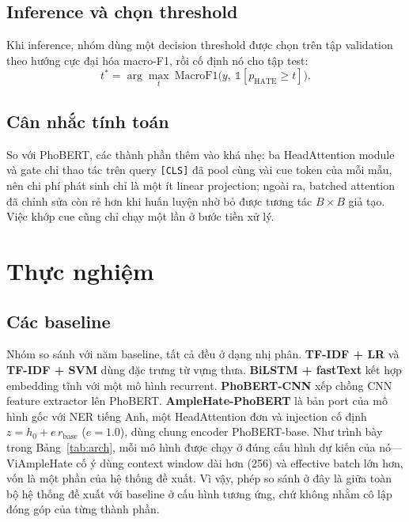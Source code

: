 \documentclass[11pt]{article}
\begin{document}
\subsection{Inference và chọn threshold}
Khi inference, nhóm dùng một decision threshold được chọn trên tập validation theo hướng cực đại hóa macro-F1, rồi cố định nó cho tập test:
\begin{equation}
  t^{*} = \arg\max_t\ \mathrm{MacroF1}\big(y,\ \mathbb{1}[p_{\mathrm{HATE}}\ge t]\big).
\end{equation}

\subsection{Cân nhắc tính toán}
So với PhoBERT, các thành phần thêm vào khá nhẹ: ba HeadAttention module và gate chỉ thao tác trên query \texttt{[CLS]} đã pool cùng vài cue token của mỗi mẫu, nên chi phí phát sinh chỉ là một ít linear projection; ngoài ra, batched attention đã chỉnh sửa còn rẻ hơn khi huấn luyện nhờ bỏ được tương tác $B\times B$ giả tạo. Việc khớp cue cũng chỉ chạy một lần ở bước tiền xử lý.

\section{Thực nghiệm}

\subsection{Các baseline}
Nhóm so sánh với năm baseline, tất cả đều ở dạng nhị phân. \textbf{TF-IDF + LR} và \textbf{TF-IDF + SVM} dùng đặc trưng từ vựng thưa. \textbf{BiLSTM + fastText} \citep{fasttext} kết hợp embedding tĩnh với một mô hình recurrent. \textbf{PhoBERT-CNN} xếp chồng CNN feature extractor lên PhoBERT. \textbf{AmpleHate-PhoBERT} là bản port của mô hình gốc với NER tiếng Anh, một HeadAttention đơn và injection cố định $z=h_0+e\,r_{\mathrm{base}}$ ($e=1.0$), dùng chung encoder PhoBERT-base. Như trình bày trong Bảng~\ref{tab:arch}, mỗi mô hình được chạy ở đúng cấu hình dự kiến của nó---ViAmpleHate cố ý dùng context window dài hơn (256) và effective batch lớn hơn, vốn là một phần của hệ thống đề xuất. Vì vậy, phép so sánh ở đây là giữa toàn bộ hệ thống đề xuất với baseline ở cấu hình tương ứng, chứ không nhằm cô lập đóng góp của từng thành phần.
\end{document}
